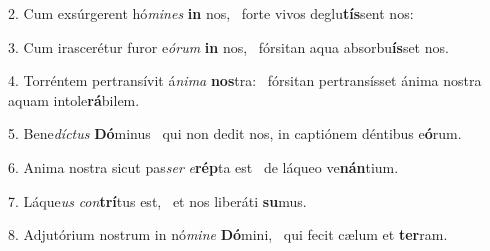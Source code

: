 2. Cum exsúrgerent hó\textit{mi}\textit{nes} \textbf{in} nos, \ast\  forte vivos deglu\textbf{tís}sent nos:\

3. Cum irascerétur furor e\textit{ó}\textit{rum} \textbf{in} nos, \ast\  fórsitan aqua absorbu\textbf{ís}set nos.\

4. Torréntem pertransívit á\textit{ni}\textit{ma} \textbf{nos}tra: \ast\  fórsitan pertransísset ánima nostra aquam intole\textbf{rá}bilem.\

5. Bene\textit{díc}\textit{tus} \textbf{Dó}minus \ast\  qui non dedit nos, in captiónem déntibus e\textbf{ó}rum.\

6. Anima nostra sicut pas\textit{ser} \textit{e}\textbf{rép}ta est \ast\  de láqueo ve\textbf{nán}tium.\

7. Láque\textit{us} \textit{con}\textbf{trí}tus est, \ast\  et nos liberáti \textbf{su}mus.\

8. Adjutórium nostrum in nó\textit{mi}\textit{ne} \textbf{Dó}mini, \ast\  qui fecit cælum et \textbf{ter}ram.\

